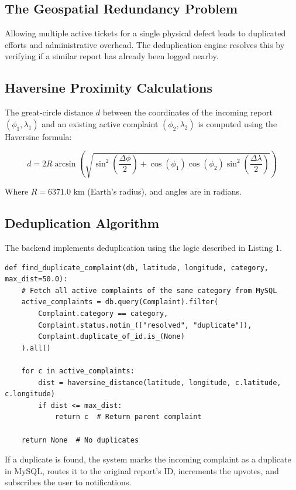 \documentclass[journal]{IEEEtran}
\begin{document}
\subsection{The Geospatial Redundancy Problem}
Allowing multiple active tickets for a single physical defect leads to duplicated efforts and administrative overhead. The deduplication engine resolves this by verifying if a similar report has already been logged nearby.

\subsection{Haversine Proximity Calculations}
The great-circle distance $d$ between the coordinates of the incoming report $(\phi_1, \lambda_1)$ and an existing active complaint $(\phi_2, \lambda_2)$ is computed using the Haversine formula:

\begin{equation}
d = 2 R \arcsin\left(\sqrt{\sin^2\left(\frac{\Delta \phi}{2}\right) + \cos(\phi_1)\cos(\phi_2)\sin^2\left(\frac{\Delta \lambda}{2}\right)}\right)
\end{equation}

Where $R = 6371.0\text{ km}$ (Earth's radius), and angles are in radians.

\subsection{Deduplication Algorithm}
The backend implements deduplication using the logic described in Listing 1.

\begin{lstlisting}[caption={MySQL Deduplication Engine implementation}]
def find_duplicate_complaint(db, latitude, longitude, category, max_dist=50.0):
    # Fetch all active complaints of the same category from MySQL
    active_complaints = db.query(Complaint).filter(
        Complaint.category == category,
        Complaint.status.notin_(["resolved", "duplicate"]),
        Complaint.duplicate_of_id.is_(None)
    ).all()
    
    for c in active_complaints:
        dist = haversine_distance(latitude, longitude, c.latitude, c.longitude)
        if dist <= max_dist:
            return c  # Return parent complaint
            
    return None  # No duplicates
\end{lstlisting}

If a duplicate is found, the system marks the incoming complaint as a duplicate in MySQL, routes it to the original report's ID, increments the upvotes, and subscribes the user to notifications.
\end{document}
